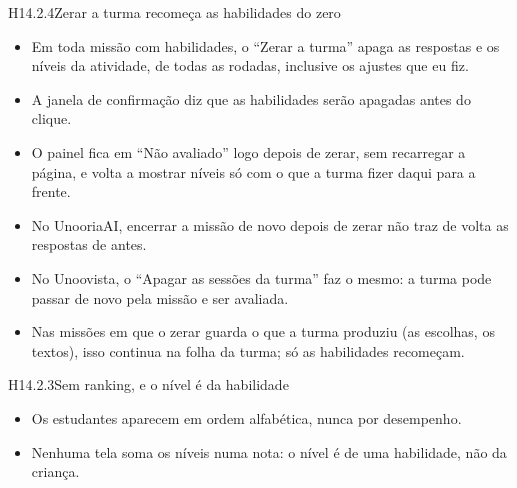 \begin{historia}{H14.2.4}{Zerar a turma recomeça as habilidades do zero}{\pronto}
\aceite
\begin{itemize}
  \item Em toda missão com habilidades, o \enquote{Zerar a turma} apaga as
    respostas e os níveis da atividade, de todas as rodadas, inclusive os
    ajustes que eu fiz.
  \item A janela de confirmação diz que as habilidades serão apagadas antes
    do clique.
  \item O painel fica em \enquote{Não avaliado} logo depois de zerar, sem
    recarregar a página, e volta a mostrar níveis só com o que a turma fizer
    daqui para a frente.
  \item No UnooriaAI, encerrar a missão de novo depois de zerar não traz de
    volta as respostas de antes.
  \item No Unoovista, o \enquote{Apagar as sessões da turma} faz o mesmo: a
    turma pode passar de novo pela missão e ser avaliada.
  \item Nas missões em que o zerar guarda o que a turma produziu (as escolhas,
    os textos), isso continua na folha da turma; só as habilidades recomeçam.
\end{itemize}
\end{historia}

\begin{historia}{H14.2.3}{Sem ranking, e o nível é da habilidade}{\parcial}
\aceite
\begin{itemize}
  \item Os estudantes aparecem em ordem alfabética, nunca por desempenho.
  \item Nenhuma tela soma os níveis numa nota: o nível é de uma habilidade, não
    da criança.
\end{itemize}
\end{historia}


